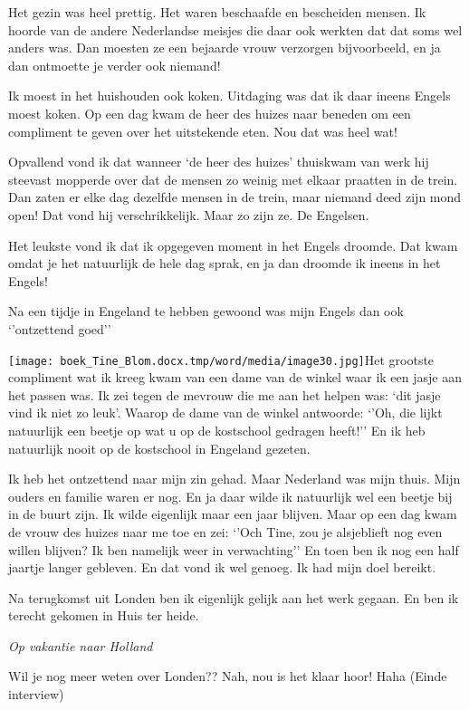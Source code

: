 \documentclass{scrbook}
\begin{document}
{Het gezin was heel prettig. Het waren beschaafde en bescheiden mensen. Ik hoorde van de andere Nederlandse meisjes die daar ook werkten dat dat soms wel anders was. Dan moesten ze een bejaarde vrouw verzorgen bijvoorbeeld, en ja dan ontmoette je verder ook niemand! 

Ik moest in het huishouden ook koken. Uitdaging was dat ik daar ineens Engels moest koken. Op een dag kwam de heer des huizes naar beneden om een compliment te geven over het uitstekende eten. Nou dat was heel wat! 

Opvallend vond ik dat wanneer ‘de heer des huizes’ thuiskwam van werk hij steevast mopperde over dat de mensen zo weinig met elkaar praatten in de trein. Dan zaten er elke dag dezelfde mensen in de trein, maar niemand deed zijn mond open! Dat vond hij verschrikkelijk. Maar zo zijn ze. De Engelsen. 

Het leukste vond ik dat ik opgegeven moment in het Engels droomde. Dat kwam omdat je het natuurlijk de hele dag sprak, en ja dan droomde ik ineens in het Engels! 

Na een tijdje in Engeland te hebben gewoond was mijn Engels dan ook ‘’ontzettend goed’’ 

\texttt{[image: boek\_Tine\_Blom.docx.tmp/word/media/image30.jpg]}Het grootste compliment wat ik kreeg kwam van een dame van de winkel waar ik een jasje aan het passen was. Ik zei tegen de mevrouw die me aan het helpen was: ‘dit jasje vind ik niet zo leuk’. Waarop de dame van de winkel antwoorde: ‘’Oh, die lijkt natuurlijk een beetje op wat u op de kostschool gedragen heeft!’’ En ik heb natuurlijk nooit op de kostschool in Engeland gezeten. 

Ik heb het ontzettend naar mijn zin gehad. Maar Nederland was mijn thuis. Mijn ouders en familie waren er nog. En ja daar wilde ik natuurlijk wel een beetje bij in de buurt zijn. Ik wilde eigenlijk maar een jaar blijven. Maar op een dag kwam de vrouw des huizes naar me toe en zei: ‘’Och Tine, zou je alsjeblieft nog even willen blijven? Ik ben namelijk weer in verwachting’’ En toen ben ik nog een half jaartje langer gebleven. En dat vond ik wel genoeg. Ik had mijn doel bereikt. 

Na terugkomst uit Londen ben ik eigenlijk gelijk aan het werk gegaan. En ben ik terecht gekomen in Huis ter heide. 

\textit{Op vakantie naar Holland }



  Wil je nog meer weten over Londen?? Nah, nou is het klaar hoor! Haha (Einde interview) 

}
\end{document}
